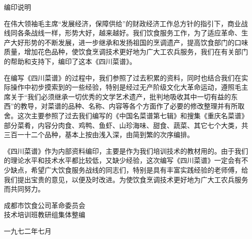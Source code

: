 \begin{center}
\Large
编印说明
\end{center}

在伟大领袖毛主席{\sffamily“发展经济，保障供给”}的财政经济工作总方针的指引下，商业战线同各条战线一样，形势大好，越来越好。我们饮食服务工作，为了适应革命、生产大好形势的不断发展，进一步继承和发扬祖国的烹调遗产，提高饮食部门的口味质量，增加花色品种，使饮食烹调技术更好地为广大工农兵服务，我们在有关部门的帮助和支持下，编印了这本《四川菜谱》。

在编写《四川菜谱》的过程中，我们参照了过去积累的资料，同时也结合我们在实际操作中初步摸索到的一些经验，特别是经过无产阶级文化大革命运动，遵照毛主席关于{\sffamily“我们必须继承一切优秀的文学艺术遗产，批判地吸收其中一切有益的东西”}的教导，对菜谱的品种、名称、内容等各个方面作了必要的修改整理并有所取舍。这次主要参照了过去我们编写的《中国名菜谱第七辑》和搜集《重庆名菜谱》部分菜肴，内容分肉食、鸡鸭、鱼虾、山珍海味、甜食、蔬菜、其它七个大类，共三百一十二个品种，基本上按由浅入深，由简到繁的次序编排。

《四川菜谱》作为内部资料编印，主要是作为我们培训技术的教材用的。由于我们的理论水平和技术水平都比较低，又缺少经验，这次编写《四川菜谱》一定会有不少缺点，希望广大饮食服务战线的同志们，特别是具有丰富实践经验的老师傅，给我们提出宝贵的意见，以便及时改进。为使饮食烹调技术更好地为广大工农兵服务而共同努力。

\begin{flushright}
成都市饮食公司革命委员会\\
技术培训班教研组集体整编

一九七二年七月
\end{flushright}


